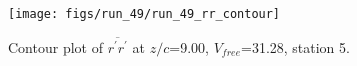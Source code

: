 \begin{figure}[H]
\centering
\texttt{[image: figs/run\_49/run\_49\_rr\_contour]}
\caption{Contour plot of $\overline{r^\prime r^\prime}$ at $z/c$=9.00, $V_{free}$=31.28, station 5.}
\label{fig:run_49_rr_contour}
\end{figure}


